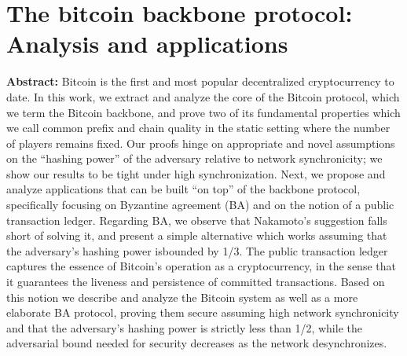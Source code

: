 \section{The bitcoin backbone protocol: Analysis and applications}

\textbf{Abstract:} 
Bitcoin is the first and most popular decentralized cryptocurrency to date. In this work, we extract and analyze the core of the Bitcoin protocol, which we term the Bitcoin backbone, and prove two of its fundamental properties which we call common prefix and chain quality in the static setting where the number of players remains fixed. Our proofs hinge on appropriate and novel assumptions on the “hashing power” of the adversary relative to network synchronicity; we show our results to be tight under high synchronization. Next, we propose and analyze applications that can be built “on top” of the backbone protocol, specifically focusing on Byzantine agreement (BA) and on the notion of a public transaction ledger. Regarding BA, we observe that Nakamoto’s suggestion falls short of solving it, and present a simple alternative which works assuming that the adversary’s hashing power isbounded by 1/3. The public transaction ledger captures the essence of Bitcoin’s operation as a cryptocurrency, in the sense that it guarantees the liveness and persistence of committed transactions. Based on this notion we describe and analyze the Bitcoin system as well as a more elaborate BA protocol, proving them secure assuming high network synchronicity and that the adversary’s hashing power is strictly less than 1/2, while the adversarial bound needed for security decreases as the network desynchronizes.

